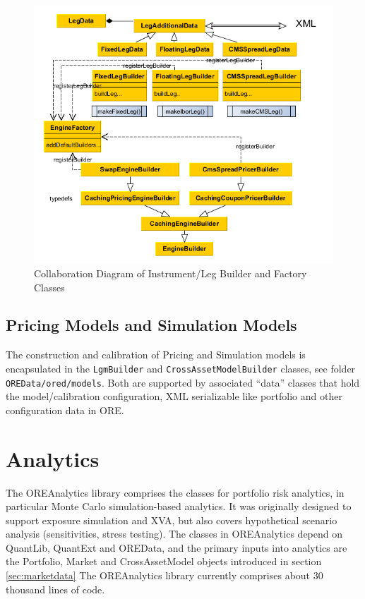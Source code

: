 \documentclass[12pt, a4paper]{article}
\begin{document}
\begin{figure}[h]
\begin{center}
\includegraphics[scale=0.6]{ORED_Portfolio}
\end{center}
\caption{Collaboration Diagram of Instrument/Leg Builder and Factory Classes}
\label{fig_OREDPortfolio}
\end{figure}

\subsection{Pricing Models and Simulation Models}
The construction and calibration of Pricing and Simulation models is encapsulated in the {\tt LgmBuilder} and {\tt CrossAssetModelBuilder} classes, see folder {\tt OREData/ored/models}. Both are supported by associated ``data'' classes that hold
the model/calibration configuration, XML serializable like portfolio and other configuration data in ORE.

\newpage
\section{Analytics}
The OREAnalytics library comprises the classes for portfolio risk analytics, in particular Monte Carlo simulation-based analytics. It was originally designed to support exposure simulation and XVA, but also covers hypothetical scenario analysis
(sensitivities, stress testing). The classes in OREAnalytics depend on QuantLib, QuantExt and OREData, and the primary inputs into analytics are the Portfolio, Market and CrossAssetModel objects introduced in section \ref{sec:marketdata}
The OREAnalytics library currently comprises about 30 thousand lines of code.
\end{document}
